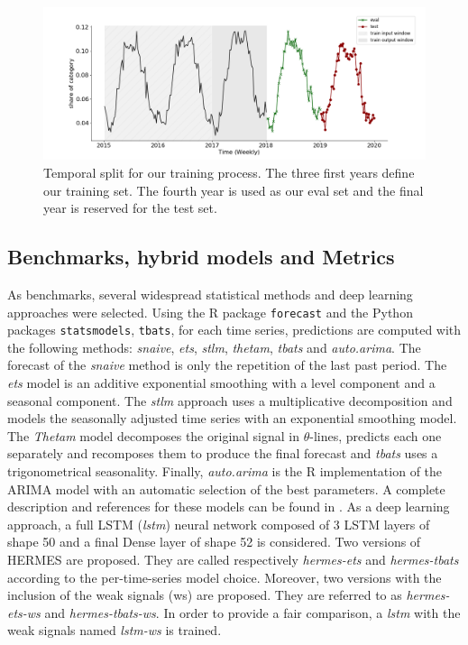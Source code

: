 \documentclass[review]{elsarticle}
\begin{document}
\begin{figure}
  \centering
    \includegraphics[width=1.\linewidth]{train_eval_test_set}
  \caption{Temporal split for our training process. The three first years define our training set. The fourth year is used as our eval set and the final year is reserved for the test set.}
\label{fig:train_eval_test_set}
\end{figure}

\subsection{Benchmarks, hybrid models and Metrics}
\label{sec:fashiontraining}

As benchmarks, several widespread statistical methods and deep learning approaches were selected. Using the R package \texttt{forecast} and the Python packages \texttt{statsmodels},  \texttt{tbats}, for each time series, predictions are computed with the following methods: \textit{snaive}, \textit{ets}, \textit{stlm}, \textit{thetam}, \textit{tbats} and \textit{auto.arima}. The forecast of the \textit{snaive} method is only the repetition of the last past period. The \textit{ets} model is an additive exponential smoothing with a level component and a seasonal component. The \textit{stlm} approach uses a multiplicative decomposition and models the seasonally adjusted time series with an exponential smoothing model. The \textit{Thetam} model decomposes the original signal in $\theta$-lines, predicts each one separately and recomposes them to produce the final forecast and \textit{tbats} uses a trigonometrical seasonality. Finally, \textit{auto.arima} is the R implementation of the ARIMA model with an automatic selection of the best parameters. A complete description and references for these models can be found in \cite{hyndman2020}. As a deep learning approach, a full LSTM (\textit{lstm}) neural network composed of 3 LSTM layers of shape 50 and a final Dense layer of shape 52 is considered.
Two versions of HERMES are proposed. They are called respectively \textit{hermes-ets} and \textit{hermes-tbats} according to the per-time-series model choice. Moreover, two versions with the inclusion of the weak signals (ws) are proposed. They are referred to as \textit{hermes-ets-ws} and \textit{hermes-tbats-ws}. In order to provide a fair comparison, a \textit{lstm} with the weak signals named \textit{lstm-ws} is trained.
\end{document}
